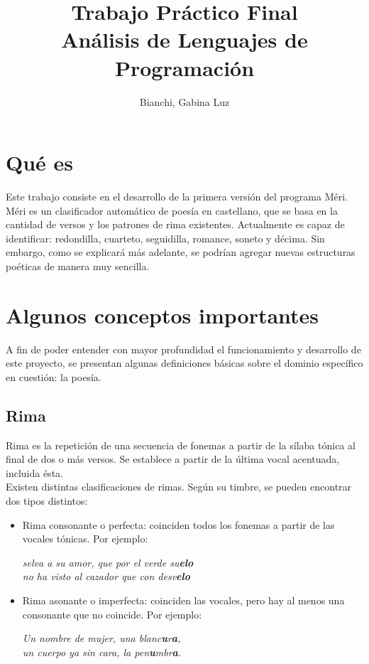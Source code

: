 \documentclass[12pt, a4paper]{article}
\begin{document}
 
\title{Trabajo Práctico Final\\ Análisis de Lenguajes de Programación} 
\author{Bianchi, Gabina Luz} 
\maketitle

\section*{Qué es}
Este trabajo consiste en el desarrollo de la primera versión del programa Méri. Méri es un clasificador automático de poesía en castellano, que se basa en la cantidad de versos y los patrones de rima existentes. Actualmente es capaz de identificar: redondilla, cuarteto, seguidilla, romance, soneto y décima.	
Sin embargo, como se explicará más adelante, se podrían agregar nuevas estructuras poéticas de manera muy sencilla.
\section*{Algunos conceptos importantes}
A fin de poder entender con mayor profundidad el funcionamiento y desarrollo de este proyecto, se presentan algunas definiciones básicas sobre el dominio específico en cuestión: la poesía.
\subsection*{Rima}
Rima es la repetición de una secuencia de fonemas a partir de la sílaba tónica al final de dos o más versos. Se establece a partir de la última vocal acentuada, incluida ésta.\\
Existen distintas clasificaciones de rimas. Según su timbre, se pueden encontrar dos tipos distintos:
\begin{itemize}
	\item Rima consonante o perfecta: coinciden todos los fonemas a partir de las vocales tónicas. Por ejemplo:
	
	\medskip
	
	\begin{center}
		\textit{selva a su amor, que por el verde su\textbf{elo}\\ no ha visto al cazador que con desv\textbf{elo}}
	\end{center}	 

	\item Rima asonante o imperfecta: coinciden las vocales, pero hay al menos una consonante que no coincide. Por ejemplo:
	
	\medskip
	
	\begin{center}
			\textit{Un nombre de mujer, una blanc\textbf{u}r\textbf{a},\\un cuerpo ya sin cara, la pen\textbf{u}mbr\textbf{a}.}	
	\end{center}

\end{itemize}
\end{document}
